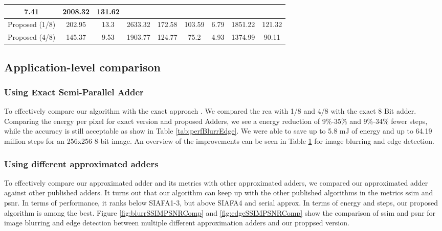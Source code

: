 \documentclass[]{IEEEtran}
\begin{document}
\begin{table}[h]
\begin{tabular}{|c|cccc|cccc|}
  \multicolumn{1}{c|}{7.41} &
  \multicolumn{1}{c|}{2008.32} &
  131.62 \\ \hline
Proposed (1/8) &
  \multicolumn{1}{c|}{202.95} &
  \multicolumn{1}{c|}{13.3} &
  \multicolumn{1}{c|}{2633.32} &
  172.58 &
  \multicolumn{1}{c|}{103.59} &
  \multicolumn{1}{c|}{6.79} &
  \multicolumn{1}{c|}{1851.22} &
  121.32 \\ \hline
Proposed (4/8) &
  \multicolumn{1}{c|}{145.37} &
  \multicolumn{1}{c|}{9.53} &
  \multicolumn{1}{c|}{1903.77} &
  124.77 &
  \multicolumn{1}{c|}{75.2} &
  \multicolumn{1}{c|}{4.93} &
  \multicolumn{1}{c|}{1374.99} &
  90.11 \\ \hline
\end{tabular}
\label{tab:imageAppComp}
\end{table}

\subsection{Application-level comparison}
\subsubsection{Using Exact Semi-Parallel Adder \cite{8832255}}
To effectively compare our algorithm with the exact approach \cite{8832255}. We compared the \gls{rca} with 1/8 and 4/8 with the exact 8 Bit adder. Comparing the energy per pixel for exact version and proposed Adders, we see a energy reduction of 9\%-35\% and 9\%-34\% fewer steps, while the accuracy is still acceptable as show in Table \ref{tab:perfBlurrEdge}. We were able to save up to 5.8 mJ of energy and up to 64.19 million steps for an 256x256 8-bit image. An overview of the improvements can be seen in Table \ref{tab:imageAppComp} for image blurring and edge detection.
\subsubsection{Using different approximated adders}
To effectively compare our approximated adder and its metrics with other approximated adders, we compared our approximated adder against other published adders. It turns out that our algorithm can keep up with the other published algorithms in the metrics \gls{ssim} and \gls{psnr}. In terms of performance, it ranks below SIAFA1-3, but above SIAFA4 and serial approx. In terms of energy and steps, our proposed algorithm is among the best. 
Figure \ref{fig:blurrSSIMPSNRComp} and \ref{fig:edgeSSIMPSNRComp} show the comparison of \gls{ssim} and \gls{psnr} for image blurring and edge detection between multiple different approximation adders and our proppsed version.
\end{document}
